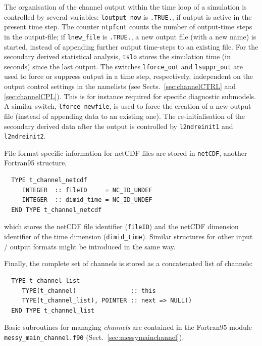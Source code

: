 \documentclass[twoside]{article}
\begin{document}
The organisation of the channel output within the time loop of a simulation is
controlled by several variables: {\tt loutput\_now} is {\tt .TRUE.}, if output
is active in the present time step. The counter {\tt ntpfcnt} counts the
number of output-time steps in the output-file; if {\tt lnew\_file} is
{\tt .TRUE.}, a new output file (with a new name) is started, instead of
appending further output time-steps to an existing file. For the
secondary derived statistical analysis, {\tt tslo} stores the simulation
time (in seconds) since the last output.
%
The switches {\tt lforce\_out} and {\tt lsuppr\_out} are used to
force or suppress output in a time step, respectively, independent on the
output control settings in the namelists (see Sects.~\ref{sec:channelCTRL}
and \ref{sec:channelCPL}).
This is for instance required for specific diagnostic submodels.
%
A similar switch, {\tt lforce\_newfile}, is used to force the creation of
a new output file (instead of appending data to an existing one).
%
The re-initialisation of the secondary derived data after the output
is controlled by {\tt l2ndreinit1} and {\tt l2ndreinit2}.

File format specific information for netCDF files are stored
in {\tt netCDF}, another Fortran95 structure,
\begin{verbatim}
  TYPE t_channel_netcdf
     INTEGER  :: fileID     = NC_ID_UNDEF
     INTEGER  :: dimid_time = NC_ID_UNDEF
  END TYPE t_channel_netcdf
\end{verbatim}
which stores the netCDF file identifier ({\tt fileID}) and the
netCDF dimension identifier of the time dimension ({\tt dimid\_time}).
%
Similar structures for other input / output formats might be introduced
in the same way.

Finally, the complete set of channels is stored as a concatenated list of
channels:
%
\begin{verbatim}
  TYPE t_channel_list
     TYPE(t_channel)               :: this
     TYPE(t_channel_list), POINTER :: next => NULL()
  END TYPE t_channel_list
\end{verbatim}

Basic subroutines for managing {\it channels}
are contained in the Fortran95 module\\
{\tt messy\_main\_channel.f90}
(Sect.~\ref{sec:messymainchannel}).

\end{document}
